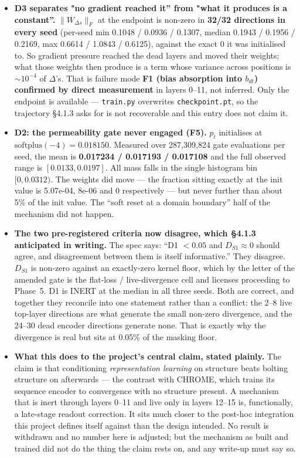 \documentclass[11pt,a4paper]{article}
\newcommand{\code}[1]{\texttt{\small #1}}
\begin{document}
\begin{itemize}
\item \textbf{D3 separates "no gradient reached it'' from "what it produces is a
constant''.} $\|W_{\Delta s}\|_F$ at the endpoint is non-zero in
\textbf{32/32 directions in every seed} (per-seed min 0.1048 / 0.0936 / 0.1307,
median 0.1943 / 0.1956 / 0.2169, max 0.6614 / 1.0843 / 0.6125), against the
exact $0$ it was initialised to. So gradient pressure reached the dead layers
and moved their weights; what those weights then produce is a term whose
variance across positions is $\sim\!10^{-4}$ of $\Delta$'s. That is failure mode
\textbf{F1 (bias absorption into $b_{dt}$) confirmed by direct measurement} in
layers 0--11, not inferred. Only the endpoint is available --- \code{train.py}
overwrites \code{checkpoint.pt}, so the trajectory \S4.1.3 asks for is not
recoverable and this entry does not claim it.

\item \textbf{D2: the permeability gate never engaged (F5).} $p_t$ initialises
at $\mathrm{softplus}(-4) = 0.018150$. Measured over 287{,}309{,}824 gate
evaluations per seed, the mean is \textbf{0.017234 / 0.017193 / 0.017108} and
the full observed range is $[0.0133, 0.0197]$. All mass falls in the single
histogram bin $[0, 0.0312)$. The weights did move --- the fraction sitting
exactly at the init value is 5.07e-04, 8e-06 and 0 respectively --- but never
further than about 5\% of the init value. The ``soft reset at a domain boundary''
half of the mechanism did not happen.

\item \textbf{The two pre-registered criteria now disagree, which \S4.1.3
anticipated in writing.} The spec says: ``D1 $<0.05$ and $D_{S1}\approx0$ should
agree, and disagreement between them is itself informative.'' They disagree.
$D_{S1}$ is non-zero against an exactly-zero kernel floor, which by the letter
of the amended gate is the flat-loss / live-divergence cell and licenses
proceeding to Phase~5. D1 is INERT at the median in all three seeds. Both are
correct, and together they reconcile into one statement rather than a conflict:
the 2--8 live top-layer directions are what generate the small non-zero
divergence, and the 24--30 dead encoder directions generate none. That is
exactly why the divergence is real but sits at 0.05\% of the masking floor.

\item \textbf{What this does to the project's central claim, stated plainly.}
The claim is that conditioning \emph{representation learning} on structure beats
bolting structure on afterwards --- the contrast with CHROME, which trains its
sequence encoder to convergence with no structure present. A mechanism that is
inert through layers 0--11 and live only in layers 12--15 is, functionally, a
late-stage readout correction. It sits much closer to the post-hoc integration
this project defines itself against than the design intended. No result is
withdrawn and no number here is adjusted; but the mechanism as built and trained
did not do the thing the claim rests on, and any write-up must say so.


\end{itemize}
\end{document}
